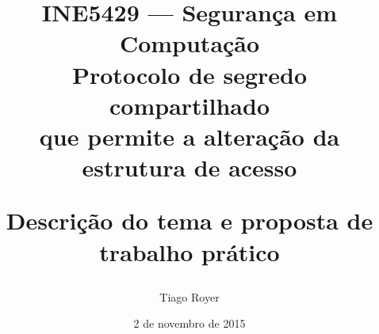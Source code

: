 \documentclass{article}
\begin{document}
\title{
    INE5429 --- Segurança em Computação \\[1ex]
    Protocolo de segredo compartilhado \\
    que permite a alteração da estrutura de acesso \\[1ex]
    \parbox{2\textwidth}{Descrição do tema e proposta de trabalho prático}
}
\author{Tiago Royer}
\date{2 de novembro de 2015}
\maketitle
\end{document}
